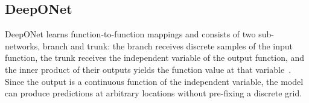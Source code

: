 \subsection{DeepONet}
DeepONet learns function-to-function mappings and consists of two sub-networks, branch and trunk: the branch receives discrete samples of the input function, the trunk receives the independent variable of the output function, and the inner product of their outputs yields the function value at that variable~\cite{lu2021deeponet}. Since the output is a continuous function of the independent variable, the model can produce predictions at arbitrary locations without pre-fixing a discrete grid.

